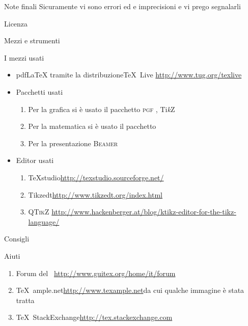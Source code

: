 \begin{frame}{Note finali}
	Sicuramente vi sono errori ed e imprecisioni e vi prego segnalarli 
	\begin{alertblock}{Licenza}
	
	\end{alertblock}
\end{frame}
\begin{frame}{Mezzi e strumenti}
	\begin{alertblock}{I mezzi usati}
		\begin{itemize}
			\item pdf\LaTeX{} tramite la distribuzione\TeX{}~Live\newline
			\url{http://www.tug.org/texlive}
			\item Pacchetti usati
			\begin{enumerate}
				\item Per la grafica si è usato il pacchetto \textsc{pgf} \pgfversion, Ti\emph{k}Z
				\item Per la matematica si è usato il pacchetto \AmS
				\item Per la presentazione \textsc{Beamer}
			\end{enumerate}
			\item Editor usati
			\begin{enumerate}
				\item \TeX{}studio\newline \url{http://texstudio.sourceforge.net/} %
				\item Tikzedt\newline \url{http://www.tikzedt.org/index.html} %
				\item \textsc{QTikZ}\newline
				\url{http://www.hackenberger.at/blog/ktikz-editor-for-the-tikz-language/}
			\end{enumerate}
		\end{itemize}
	\end{alertblock}
\end{frame}
\begin{frame}[allowframebreaks]{Consigli}
	\begin{alertblock}{Aiuti}
		\begin{enumerate}
			\item Forum del \guit\ \newline \url{http://www.guitex.org/home/it/forum}
			\item \TeX{}~ample.net\newline \url{http://www.texample.net}\newline da cui qualche immagine è stata tratta
			\item \TeX{}~StackExchange\newline \url{http://tex.stackexchange.com}
		\end{enumerate}
	\end{alertblock}
\end{frame}
